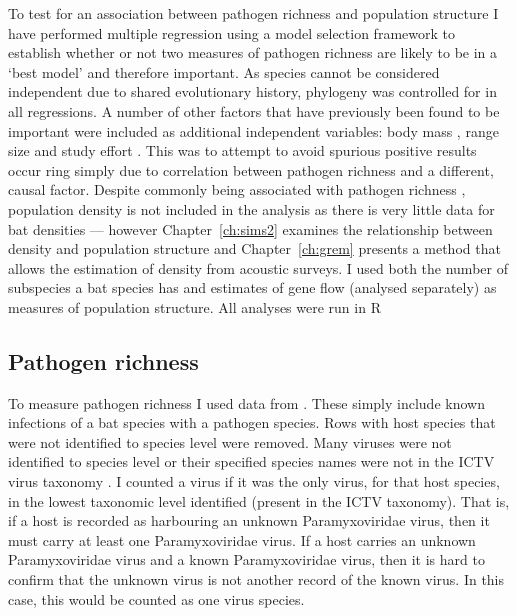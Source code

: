 To test for an association between pathogen richness and population structure I have performed multiple regression using a model selection framework to establish whether or not two measures of pathogen richness are likely to be in a `best model' and therefore important.
As species cannot be considered independent due to shared evolutionary history, phylogeny was controlled for in all regressions.
A number of other factors that have previously been found to be important were included as additional independent variables: body mass \cite{kamiya2014determines, turmelle2009correlates, gay2014parasite, maganga2014bat, han2015infectious}, range size \cite{kamiya2014determines, turmelle2009correlates, maganga2014bat} and study effort \cite{turmelle2009correlates, gay2014parasite, maganga2014bat}.
This was to attempt to avoid spurious positive results occur  ring simply due to correlation between pathogen richness and a different, causal factor.
Despite commonly being associated with pathogen richness \cite{arneberg2002host, kamiya2014determines, nunn2003comparative}, population density is not included in the analysis as there is very little data for bat densities --- however Chapter~\ref{ch:sims2} examines the relationship between density and population structure and Chapter~\ref{ch:grem} presents a method that allows the estimation of density from acoustic surveys.
I used both the number of subspecies a bat species has and estimates of gene flow (analysed separately) as measures of population structure.
All analyses were run in R \cite{R}

\subsection{Pathogen richness}

To measure pathogen richness I used data from \cite{luis2013comparison}. 
These simply include known infections of a bat species with a pathogen species. 
Rows with host species that were not identified to species level were removed.
Many viruses were not identified to species level or their specified species names were not in the ICTV virus taxonomy \cite{ICTV}.
I counted a virus if it was the only virus, for that host species, in the lowest taxonomic level identified (present in the ICTV taxonomy).
That is, if a host is recorded as harbouring an unknown Paramyxoviridae virus, then it must carry at least one Paramyxoviridae virus.
If a host carries an unknown Paramyxoviridae virus and a known Paramyxoviridae virus, then it is hard to confirm that the unknown virus is not another record of the known virus.
In this case, this would be counted as one virus species.







